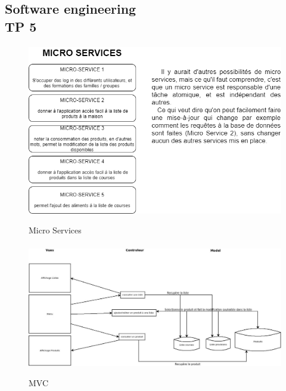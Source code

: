 \documentclass[14pt]
{article}
\begin{document}
\pagestyle{fancy}

\begin{center}
\section*{Software engineering\\\bigskip\textbf{{\LARGE TP 5}}}
\end{center}


\paragraph*{}
\begin{figure}[h!]
\includegraphics[width=1\textwidth]{images/microService.png}\\[1cm] 
\caption{Micro Services} 
\end{figure}

\paragraph*{}
\begin{figure}
\includegraphics[width=1\textwidth]{images/MVC.jpg}\\[1cm]
\caption{MVC} 
\end{figure}
\end{document}
